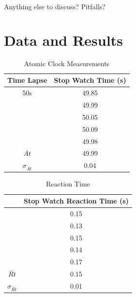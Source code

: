 \documentclass[iop]{emulateapj}
\begin{document}
Anything else to discuss?  Pitfalls?










\section{Data and Results}
\label{sec:data}



\begin{table}[H]
\caption{Atomic Clock Measurements} %
\centering %
\begin{tabular}{c c} %
\hline\hline %
Time Lapse & Stop Watch Time (s) \\ [0.5ex] %
\hline %
50s & 49.85 \\ %
    & 49.99 \\
    & 50.05 \\
    & 50.09 \\
    & 49.98 \\
$\overline{At}$ & 49.99 \\
$\sigma_{\overline{At}}$ & 0.04 \\    [1ex] %
\hline %
\end{tabular}
\label{table:nonlin} %
\end{table}


\begin{table}[H]
\caption{Reaction Time} %
\centering %
\begin{tabular}{c c} %
\hline\hline %
& Stop Watch Reaction Time (s) \\ [0.5ex] %
\hline %
& 0.15 \\ %
& 0.13\\
& 0.15\\
& 0.14\\
& 0.17\\
$\overline{Rt}$ & 0.15 \\
$\sigma_{\overline{Rt}}$ & 0.01 \\    [1ex] %
\hline %
\end{tabular}
\label{table:nonlin} %
\end{table}
\end{document}
